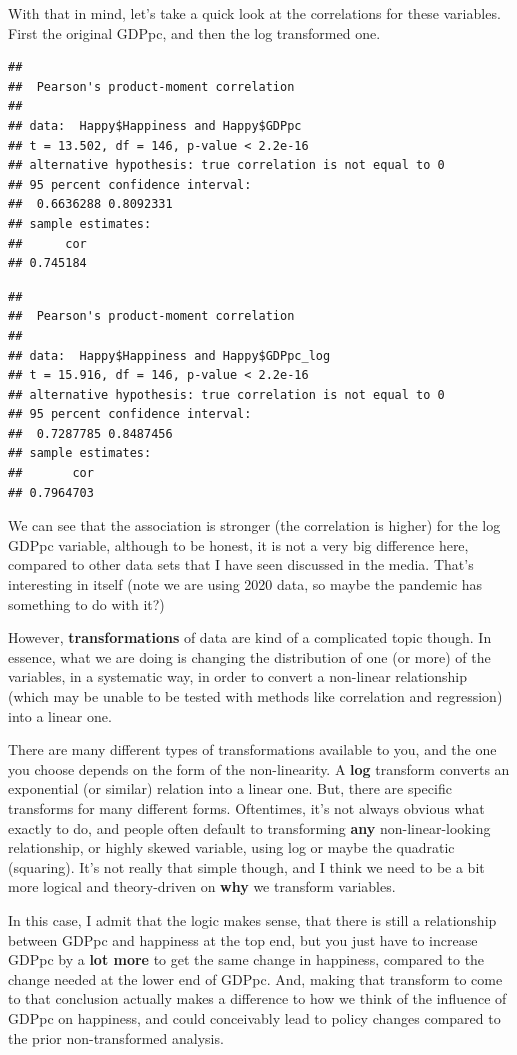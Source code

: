\documentclass[
]{book}
\begin{document}
With that in mind, let's take a quick look at the correlations for these variables. First the original GDPpc, and then the log transformed one.

\begin{verbatim}
## 
##  Pearson's product-moment correlation
## 
## data:  Happy$Happiness and Happy$GDPpc
## t = 13.502, df = 146, p-value < 2.2e-16
## alternative hypothesis: true correlation is not equal to 0
## 95 percent confidence interval:
##  0.6636288 0.8092331
## sample estimates:
##      cor 
## 0.745184
\end{verbatim}

\begin{verbatim}
## 
##  Pearson's product-moment correlation
## 
## data:  Happy$Happiness and Happy$GDPpc_log
## t = 15.916, df = 146, p-value < 2.2e-16
## alternative hypothesis: true correlation is not equal to 0
## 95 percent confidence interval:
##  0.7287785 0.8487456
## sample estimates:
##       cor 
## 0.7964703
\end{verbatim}

We can see that the association is stronger (the correlation is higher) for the log GDPpc variable, although to be honest, it is not a very big difference here, compared to other data sets that I have seen discussed in the media. That's interesting in itself (note we are using 2020 data, so maybe the pandemic has something to do with it?)

However, \textbf{transformations} of data are kind of a complicated topic though. In essence, what we are doing is changing the distribution of one (or more) of the variables, in a systematic way, in order to convert a non-linear relationship (which may be unable to be tested with methods like correlation and regression) into a linear one.

There are many different types of transformations available to you, and the one you choose depends on the form of the non-linearity. A \textbf{log} transform converts an exponential (or similar) relation into a linear one. But, there are specific transforms for many different forms. Oftentimes, it's not always obvious what exactly to do, and people often default to transforming \textbf{any} non-linear-looking relationship, or highly skewed variable, using log or maybe the quadratic (squaring). It's not really that simple though, and I think we need to be a bit more logical and theory-driven on \textbf{why} we transform variables.

In this case, I admit that the logic makes sense, that there is still a relationship between GDPpc and happiness at the top end, but you just have to increase GDPpc by a \textbf{lot more} to get the same change in happiness, compared to the change needed at the lower end of GDPpc. And, making that transform to come to that conclusion actually makes a difference to how we think of the influence of GDPpc on happiness, and could conceivably lead to policy changes compared to the prior non-transformed analysis.
\end{document}
